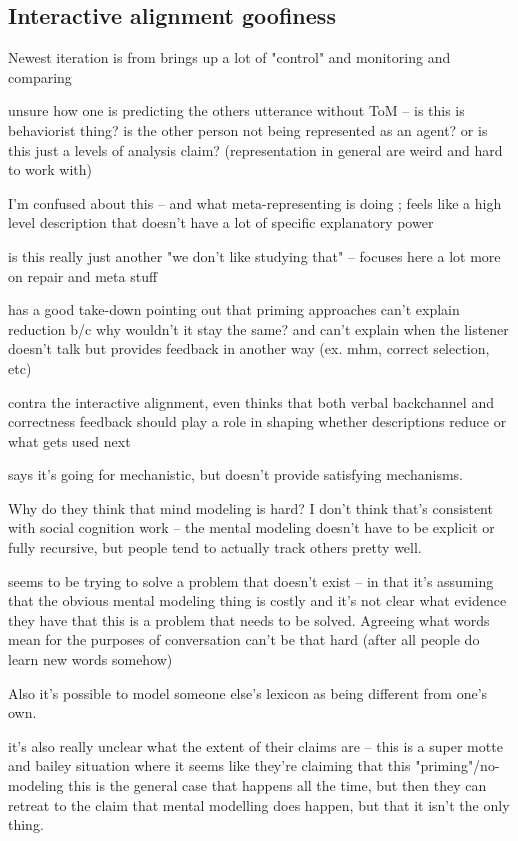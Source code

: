 \documentclass[]{article}
\begin{document}
\subsection{Interactive alignment goofiness}


Newest iteration is from \cite{gandolfi2022} brings up a lot of "control" and monitoring and comparing 

unsure how one is predicting the others utterance without ToM -- is this is behaviorist thing? is the other person not being represented as an agent? or is this just a levels of analysis claim? (representation in general are weird and hard to work with)

I'm confused about this -- and what meta-representing is doing ; feels like a high level description that doesn't have a lot of specific explanatory power

is this really just another "we don't like studying that" -- focuses here a lot more on repair and meta stuff 

\cite{hawkins2021} has a good take-down pointing out that priming approaches can't explain reduction b/c why wouldn't it stay the same? and can't explain when the listener doesn't talk but provides feedback in another way (ex. mhm, correct selection, etc) 

contra the interactive alignment, even \cite{krauss1966} thinks that both verbal backchannel and correctness feedback should play a role in shaping whether descriptions reduce or what gets used next 

\cite{pickering2004} says it's going for mechanistic, but doesn't provide satisfying mechanisms. 

Why do they think that mind modeling is hard? I don't think that's consistent with social cognition work -- the mental modeling doesn't have to be explicit or fully recursive, but people tend to actually track others pretty well. 

\cite{pickering2004} seems to be trying to solve a problem that doesn't exist -- in that it's assuming that the obvious mental modeling thing is costly and it's not clear what evidence they have that this is a problem that needs to be solved. Agreeing what words mean for the purposes of conversation can't be that hard (after all people do learn new words somehow)

Also it's possible to model someone else's lexicon as being different from one's own. 

\cite{pickering} it's also really unclear what the extent of their claims are -- this is a super motte and bailey situation where it seems like they're claiming that this "priming"/no-modeling this is the general case that happens all the time, but then they can retreat to the claim that mental modelling does happen, but that it isn't the only thing. 
\end{document}
